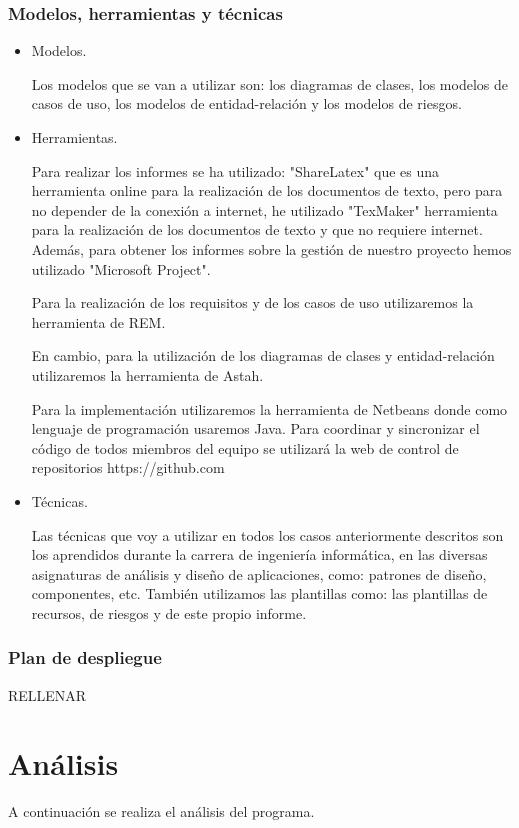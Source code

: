 \documentclass[a4paper,11pt, twoside]{article}
\begin{document}
\subsubsection{Modelos, herramientas y técnicas}
\begin{itemize}[noitemsep,topsep=0pt]
\item Modelos.

\quad Los modelos que se van a utilizar son: los diagramas de clases, los modelos de casos de uso, los modelos de entidad-relación y los modelos de riesgos. 

\item Herramientas.

\quad Para realizar los informes se ha utilizado: "ShareLatex" que es una herramienta online para la realización de los documentos de texto, pero para no depender de la conexión a internet, he utilizado "TexMaker" herramienta para la realización de los documentos de texto y que no requiere internet. Además, para obtener los informes sobre la gestión de nuestro proyecto hemos utilizado "Microsoft Project".

\quad Para la realización de los requisitos y de los casos de uso utilizaremos la herramienta de REM.

\quad En cambio, para la utilización de los diagramas de clases y entidad-relación utilizaremos la herramienta de Astah.

\quad Para la implementación utilizaremos la herramienta de Netbeans donde como lenguaje de programación usaremos Java. Para coordinar y sincronizar el código de todos miembros del equipo se utilizará la web de control de repositorios https://github.com

\item Técnicas.

\quad Las técnicas que voy a utilizar en todos los casos anteriormente descritos son los aprendidos durante la carrera de ingeniería informática, en las diversas asignaturas de análisis y diseño de aplicaciones, como: patrones de diseño, componentes, etc. También utilizamos las plantillas como: las plantillas de recursos, de riesgos y de este propio informe.

\end{itemize}
\subsubsection{Plan de despliegue}
{\color{red} RELLENAR }
\section{Análisis}
A continuación se realiza el análisis del programa.
\end{document}
